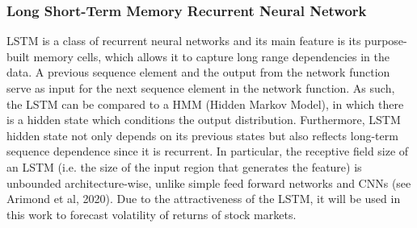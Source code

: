 \documentclass[a4paper,11pt,oneside]{book}
\begin{document}
\subsubsection{Long Short-Term Memory Recurrent Neural Network}
LSTM is a class of recurrent neural networks and its main feature is its purpose-built memory cells, which allows it to capture long range dependencies in the data.\newline\newline
A previous sequence element and the output from the network function serve as input for the next sequence element in the network function. As such, the LSTM can be compared to a HMM (Hidden Markov Model), in which there is a hidden state which conditions the output distribution. Furthermore, LSTM hidden state not only depends on its previous states but also reflects long-term sequence dependence since it is recurrent. In particular, the receptive field size of an LSTM (i.e. the size of the input region that generates the feature) is unbounded architecture-wise, unlike simple feed forward networks and CNNs (see Arimond et al, 2020). \newline\newline Due to the attractiveness of the LSTM, it will be used in this work to forecast volatility of returns of stock markets. \newline\newline
\end{document}

